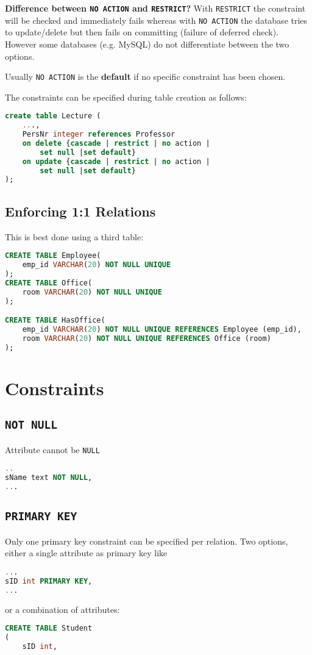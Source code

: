 \documentclass{sciposter}
\renewcommand{\t}[1]{\texttt{#1}}
\begin{document}
\begin{multicols}{3}
\textbf{Difference between \t{NO ACTION} and \t{RESTRICT}?} With \t{RESTRICT} the constraint will be checked and immediately fails whereas with \t{NO ACTION} the database tries to update/delete but then fails on committing (failure of deferred check). However some databases (e.g. MySQL) do not differentiate between the two options.

Usually \t{NO ACTION} is the \textbf{default} if no specific constraint has been chosen.

The constraints can be specified during table creation as follows:

\begin{lstlisting}[language=SQL]
create table Lecture (
	...,
	PersNr integer references Professor
	on delete {cascade | restrict | no action |
		set null |set default}
	on update {cascade | restrict | no action |
		set null |set default}
); 
\end{lstlisting}

\subsection*{Enforcing 1:1 Relations}

This is best done using a third table:
\begin{lstlisting}[language=SQL]
CREATE TABLE Employee(
	emp_id VARCHAR(20) NOT NULL UNIQUE
);
CREATE TABLE Office(
	room VARCHAR(20) NOT NULL UNIQUE
);

CREATE TABLE HasOffice(
	emp_id VARCHAR(20) NOT NULL UNIQUE REFERENCES Employee (emp_id),
	room VARCHAR(20) NOT NULL UNIQUE REFERENCES Office (room)
);
\end{lstlisting}

\section*{Constraints}

\subsection*{\t{NOT NULL}}
Attribute cannot be \t{NULL}
\begin{lstlisting}[language=SQL]
..
sName text NOT NULL,
...

\end{lstlisting}
\subsection*{\t{PRIMARY KEY}}
Only one primary key constraint can be specified per relation.
Two options, either a single attribute as primary key like
\begin{lstlisting}[language=SQL]
...
sID int PRIMARY KEY,
...
\end{lstlisting}
or a combination of attributes:
\begin{lstlisting}[language=SQL]
CREATE TABLE Student
(
	sID int,


\end{lstlisting}
\end{multicols}
\end{document}
